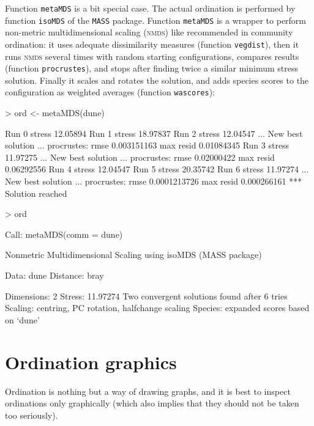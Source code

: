 \documentclass[a4paper,10pt]{amsart}
\begin{document}
Function \texttt{metaMDS} is a bit special case.  The actual
ordination is performed by function \texttt{isoMDS} of the \texttt{MASS}
package.  Function \texttt{metaMDS} is a wrapper to perform non-metric
multidimensional scaling (\textsc{nmds}) like recommended in community
ordination: it uses adequate dissimilarity measures (function
\texttt{vegdist}), then it runs \textsc{nmds} several times with
random starting configurations, compares results (function
\texttt{procrustes}), and stops after finding twice a similar minimum stress
solution.  Finally it scales and rotates the solution, and adds
species scores to the configuration as weighted averages (function
\texttt{wascores}):
\begin{Schunk}
\begin{Sinput}
> ord <- metaMDS(dune)
\end{Sinput}
\begin{Soutput}
Run 0 stress 12.05894 
Run 1 stress 18.97837 
Run 2 stress 12.04547 
... New best solution
... procrustes: rmse 0.003151163  max resid 0.01084345 
Run 3 stress 11.97275 
... New best solution
... procrustes: rmse 0.02000422  max resid 0.06292556 
Run 4 stress 12.04547 
Run 5 stress 20.35742 
Run 6 stress 11.97274 
... New best solution
... procrustes: rmse 0.0001213726  max resid 0.000266161 
*** Solution reached
\end{Soutput}
\begin{Sinput}
> ord
\end{Sinput}
\begin{Soutput}
Call:
metaMDS(comm = dune) 

Nonmetric Multidimensional Scaling using isoMDS (MASS package)

Data:     dune 
Distance: bray 

Dimensions: 2 
Stress:     11.97274 
Two convergent solutions found after 6 tries
Scaling: centring, PC rotation, halfchange scaling 
Species: expanded scores based on ‘dune’ 
\end{Soutput}
\end{Schunk}

\section{Ordination graphics}

Ordination is nothing but a way of drawing graphs, and it is best to
inspect ordinations only graphically (which also implies that they
should not be taken too seriously).
\end{document}
